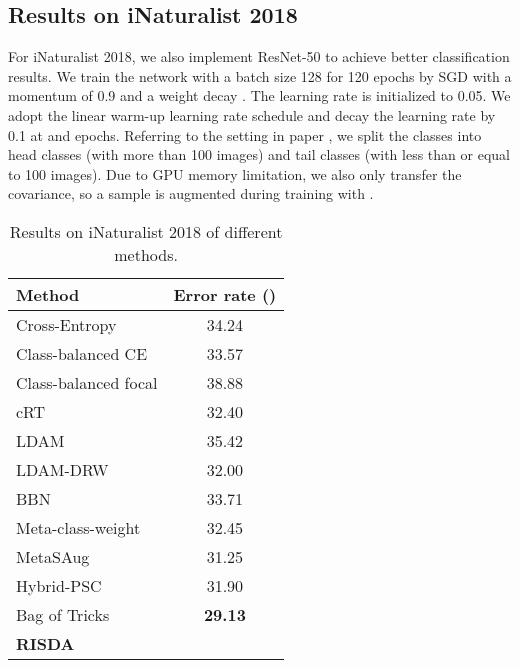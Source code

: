 \documentclass[letterpaper]{article} \usepackage{aaai22}  \usepackage{times}  \usepackage{helvet}  \usepackage{courier}  \usepackage[hyphens]{url}  \usepackage{graphicx} \usepackage{bm}
\begin{document}
	\subsection{Results on iNaturalist 2018}
For iNaturalist 2018, we also implement ResNet-50 to achieve better classification results. We train the network with a batch size 128 for 120 epochs by SGD with a momentum of 0.9
	and a weight decay . The learning rate is initialized to 0.05. We adopt the linear warm-up learning rate schedule \cite{goyal2017accurate} and decay the learning rate by 0.1 at  and  epochs. Referring to the setting in paper \cite{liu2019large}, we split the classes into head classes (with more than 100 images) and tail classes (with less than or equal to 100 images). Due to GPU memory limitation, we also only transfer the covariance, so a sample  is augmented during training with .  
\begin{table}
\centering
		\begin{tabular}{l c}
			\toprule
			Method             & Error rate ()             \\ 
			\midrule
			Cross-Entropy      &34.24            \\ 
			Class-balanced CE \cite{cui2019class}                    &33.57                      \\ 
			Class-balanced focal \cite{cui2019class}                      &38.88                      \\ 
			cRT \cite{kang2019decoupling}                      &32.40                      \\ 
			LDAM \cite{cao2019learning}             & 35.42       \\ 
			LDAM-DRW \cite{cao2019learning}   &32.00      \\ 
			BBN \cite{zhou2020bbn}     & 33.71                      \\ 
			Meta-class-weight \cite{jamal2020rethinking}                     &32.45                      \\ 
			MetaSAug \cite{li2021metasaug}        &31.25      \\     
			Hybrid-PSC \cite{wang2021contrastive}                     &31.90                      \\                
			Bag of Tricks \cite{zhang2021bag}                    &\textbf{29.13}                     \\ 
			\textbf{RISDA}   & \multicolumn{1}{c}{    } \\ 
			\bottomrule
		\end{tabular}
		\caption{Results on iNaturalist 2018 of different methods.}
\label{tab3}
	\end{table}
\end{document}
